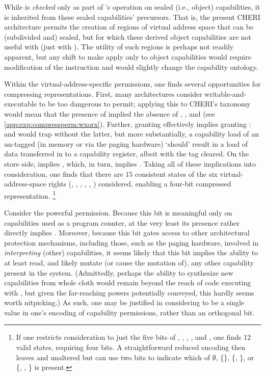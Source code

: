 While \cappermInvoke* is {\em checked} only as part of 's
operation on sealed (i.e., object) capabilities, it is inherited from these
sealed capabilities' precursors.  That is, the present CHERI architecture
permits the creation of regions of virtual address space that can be
(subdivided and) sealed, but for which these derived object capabilities are
not useful with  (just with ).
The utility of such regions is perhaps not readily apparent, but any shift
to make \cappermInvoke* apply only to object capabilities would require
modification of the  instruction and would slightly
change the capability ontology.

Within the virtual-address-specific permissions, one finds several
opportunities for compressing representations.  First, many architectures
consider writable-and-executable to be too dangerous to permit; applying
this to CHERI's taxonomy would mean that the presence of \cappermX* implied
the absence of \cappermS*, \cappermSC*, and \cappermSLC* (see
\cref{app:exp:compressperm:wxorx}).  Further, granting \cappermLC*
effectively implies granting \cappermL*:   and  would trap without
the latter, but more substantially, a capability load of an un-tagged (in
memory or via the paging hardware) `should' result in a load of data
transferred in to a capability register, albeit with the tag cleared.  On
the store side, \cappermSLC* implies \cappermSC*, which, in turn, implies
\cappermS*.  Taking all of these implications into consideration, one finds
that there are $15$ consistent states of the six virtual-address-space
rights (\cappermX*, \cappermL*, \cappermLC*, \cappermS*, \cappermSC*,
\cappermSLC*) considered, enabling a four-bit compressed representation.%
%
\footnote{If one restricts consideration to just the five bits of
\cappermL*, \cappermLC*, \cappermS*, \cappermSC*, and \cappermSLC*, one finds 12
valid states, requiring four bits.  A straightforward reduced encoding then
leaves \cappermL* and \cappermLC* unaltered but can use two bits to indicate
which of $\emptyset$, \{\cappermS*{}\}, \{\cappermSC*, \cappermS*{}\}, or
\{\cappermSLC*, \cappermSC*, \cappermS*{}\} is present.}

Consider the powerful \cappermASR permission.  Because this
bit is meaningful only on capabilities used as a program counter, at the
very least its presence rather directly implies \cappermX.  Moreover,
because this bit gates access to other architectural protection mechanisms,
including those, such as the paging hardware, involved in {\em interpreting}
(other) capabilities, it seems likely that this bit implies the ability to
at least read, and likely mutate (or cause the mutation of), any other
capability present in the system.  (Admittedly, perhaps the ability to
synthesize new capabilities from whole cloth would remain beyond the reach
of code executing with \cappermASR*, but given the far-reaching
powers potentially conveyed, this hardly seems worth nitpicking.)  As such,
one may be justified in considering \cappermASR* to be a single
value in one's encoding of capability permissions, rather than an orthogonal
bit.

